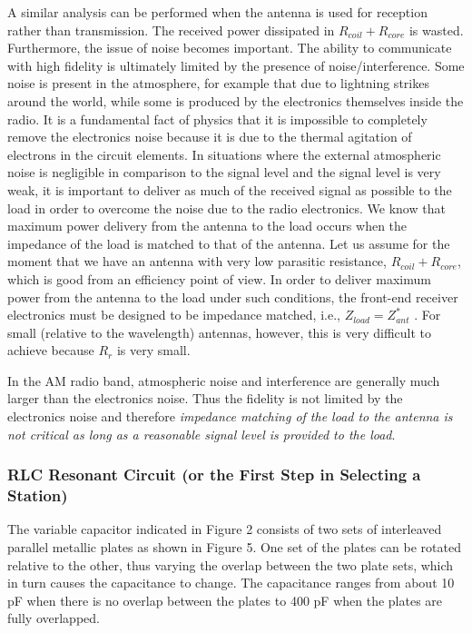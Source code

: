 \documentclass[a4paper]{article}
\begin{document}
A similar analysis can be performed when the antenna is used for reception rather than transmission. The received power dissipated in $R_{coil}+R_{core}$ is wasted. Furthermore, the issue of noise becomes important. The ability to communicate with high fidelity is ultimately limited by the presence of noise/interference. Some noise is present in the atmosphere, for example that due to lightning strikes around the world, while some is produced by the electronics themselves inside the radio. It is a fundamental fact of physics that it is impossible to completely remove the electronics noise because it is due to the thermal agitation of electrons in the circuit elements. In situations where the external atmospheric noise is negligible in comparison to the signal level and the signal level is very weak, it is important to deliver as much of the received signal as possible to the load in order to overcome the noise due to the radio electronics. We know that maximum power delivery from the antenna to the load occurs when the impedance of the load is matched to that of the antenna. Let us assume for the moment that we have an antenna with very low parasitic resistance, $R_{coil}+R_{core}$, which is good from an efficiency point of view. In order to deliver maximum power from the antenna to the load under such conditions, the front-end receiver electronics must be designed to be impedance matched, i.e., $Z_{load}=Z_{ant}^*$ . For small (relative to the wavelength) antennas, however, this is very difficult to achieve because $R_r$ is very small.

In the AM radio band, atmospheric noise and interference are generally much larger than the electronics noise. Thus the fidelity is not limited by the electronics noise and therefore \textit{impedance matching of the load to the antenna is not critical as long as a reasonable signal level is provided to the load}.
\subsubsection{RLC Resonant Circuit (or the First Step in Selecting a Station)}
The variable capacitor indicated in Figure 2 consists of two sets of interleaved parallel metallic plates as shown in Figure 5. One set of the plates can be rotated relative to the other, thus varying the overlap between the two plate sets, which in turn causes the capacitance to change. The capacitance ranges from about 10 pF when there is no overlap between the plates to 400 pF when the plates are fully overlapped.
\end{document}
